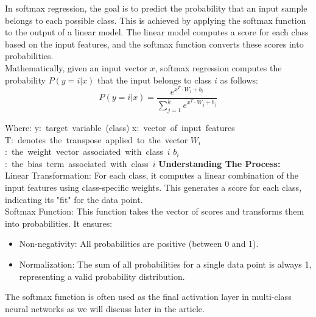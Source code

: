 \documentclass{article}
\begin{document}
In softmax regression, the goal is to predict the probability that an input sample belongs to each possible class. This is achieved by applying the softmax function to the output of a linear model. The linear model computes a score for each class based on the input features, and the softmax function converts these scores into probabilities.\\

Mathematically, given an input vector ${x}$, softmax regression computes the probability ${P(y=i | x)}$ that the input belongs to class ${i}$ as follows:
$${P(y=i | x) = \frac{e^{x^{T} \cdot W_i + b_i}}{\sum_{j=1}^{k} e^{x^{T} \cdot W_j + b_j}}
        }$$

\hbox{Where:}
\hbox{y: target variable (class)}
\hbox{x: vector of input features}
\hbox{T: denotes the transpose applied to the vector}
\hbox{${W_i}$: the weight vector associated with class ${i}$}
\hbox{${b_i}$: the bias term associated with class ${i}$}  \hfill\newline
\textbf{Understanding The Process:}\hfill\newline\\
Linear Transformation: For each class, it computes a linear combination of the input features using class-specific weights. This generates a score for each class, indicating its "fit" for the data point.\hfill\newline\\
Softmax Function: This function takes the vector of scores and transforms them into probabilities. It ensures:
\begin{itemize}
    \item Non-negativity: All probabilities are positive (between 0 and 1).
\end{itemize}
\begin{itemize}
    \item Normalization: The sum of all probabilities for a single data point is always 1, representing a valid probability distribution.
\end{itemize}
The softmax function is often used as the final activation layer in multi-class neural networks as we will discuss later in the article.
\end{document}
